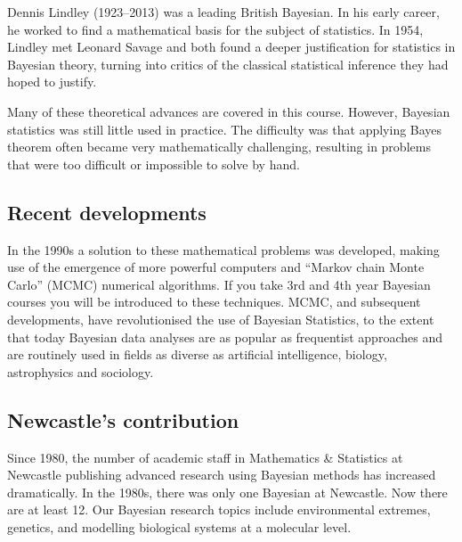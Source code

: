 Dennis Lindley (1923--2013) was a leading British Bayesian.
In his early career, he worked to find a mathematical basis for the subject of statistics.
In 1954, Lindley met Leonard Savage and both found a deeper justification for statistics in Bayesian theory, turning into critics of the classical statistical inference they had hoped to justify.


Many of these theoretical advances are covered in this course.
However, Bayesian statistics was still little used in practice.
The difficulty was that applying Bayes theorem often became very mathematically challenging,
resulting in problems that were too difficult or impossible to solve by hand.
\subsection*{Recent developments}
In the 1990s a solution to these mathematical problems was developed, making use of the emergence of more powerful computers and ``Markov chain Monte Carlo'' (MCMC) numerical algorithms.
If you take 3rd and 4th year Bayesian courses you will be introduced to these techniques.
MCMC, and subsequent developments, have revolutionised the use of Bayesian Statistics, to
the extent that today Bayesian data analyses are as popular as frequentist approaches and are routinely used in fields as diverse as artificial intelligence, biology, astrophysics and sociology.

\subsection*{Newcastle's contribution}
Since 1980, the number of academic staff in Mathematics & Statistics at Newcastle publishing advanced research using Bayesian methods has increased dramatically. In the 1980s, there was only one Bayesian at Newcastle. Now there are at least 12.
Our Bayesian research topics include environmental extremes, genetics, and modelling biological systems at a molecular level.
